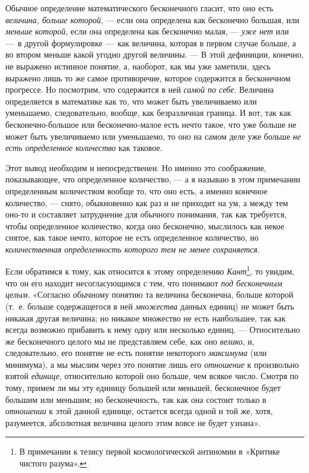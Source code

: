 {Обычное определение математического бесконечного гласит, что оно есть
{\em величина, больше которой}, — если она определена
как бесконечно большая, или {\em меньше которой}, если
она определена как бесконечно малая, — {\em уже нет}
или —~в другой формулировке —~как величина, которая в первом случае больше,
а во втором меньше какой угодно другой величины. — В этой дефиниции,
конечно, не выражено истинное понятие, а, наоборот, как мы уже заметили,
здесь выражено лишь то же самое противоречие, которое содержится в
бесконечном прогрессе. Но посмотрим, что содержится в ней
{\em самой по себе}. Величина определяется в математике
как то, что может быть увеличиваемо или уменьшаемо, следовательно, вообще,
как безразличная граница. И вот, так как бесконечно-большое или
бесконечно-малое есть нечто такое, что уже больше не может быть
увеличиваемо или уменьшаемо, то оно на самом деле уже больше
{\em не есть определенное количество} как таковое.

Этот вывод необходим и непосредственен. Но именно это соображение,
показывающее, что определенное количество, — а я называю в этом примечании
определенным количеством вообще то, что оно есть, а именно конечное
количество, — снято, обыкновенно как раз и не приходит на ум, а между тем
оно-то и составляет затруднение для обычного понимания, так как требуется,
чтобы определенное количество, когда оно бесконечно, мыслилось как некое
снятое, как такое нечто, которое не есть определенное количество, но
{\em количественная определенность которого тем не
менее сохраняется}.

Если обратимся к тому, как относится к этому определению
{\em Кант}\footnote{В примечании к тезису
первой космологической антиномии в «Критике чистого разума».}, то увидим,
что он его находит несогласующимся с тем, что понимают
{\em под бесконечным целым}. «Согласно обычному понятию
та величина бесконечна, больше которой (т.~е. больше содержащегося в ней
{\em множества} данных единиц) не может быть никакая
другая величина; но никакое множество не есть наибольшее, так как всегда
возможно прибавить к нему одну или несколько единиц. — Относительно же
бесконечного целого мы не представляем себе, как оно
{\em велико}, и, следовательно, его понятие не есть
понятие некоторого {\em максимума} (или минимума), а мы
мыслим через это понятие лишь его {\em отношение} к
произвольно взятой {\em единице}, относительно которой
оно больше, чем всякое число. Смотря по тому, примем ли мы эту единицу
большей или меньшей, бесконечное будет большим или меньшим; но
бесконечность, так как она состоит только в
{\em отношении} к этой данной единице, остается всегда
одной и той же, хотя, разумеется, абсолютная величина целого этим вовсе не
будет узнана».

}
